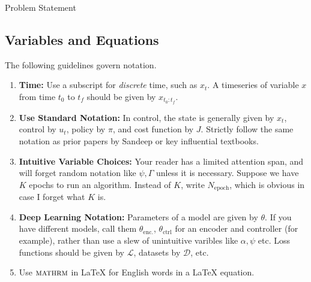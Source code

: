 Problem Statement

\subsection{Variables and Equations}

The following guidelines govern notation.

\begin{enumerate}
    \item \textbf{Time: } Use a subscript for \textit{discrete} time, such as $x_t$. A timeseries of variable $x$ from time $t_0$ to $t_f$ should be given by $x_{t_0:t_f}$.
    \item \textbf{Use Standard Notation: } In control, the state is generally given by $x_t$, control by $u_t$, policy by $\pi$, and cost function by $J$. Strictly follow the same notation as prior papers by Sandeep or key influential textbooks.
    \item \textbf{Intuitive Variable Choices: } Your reader has a limited attention span, and will forget random notation like $\psi, \Gamma$ unless it is necessary. Suppose we have $K$ epochs to run an algorithm. Instead of $K$, write $N_{\mathrm{epoch}}$, which is obvious in case I forget what $K$ is.
    \item \textbf{Deep Learning Notation: } Parameters of a model are given by $\theta$. If you have different models, call them $\theta_{\mathrm{enc.}}$, $\theta_{\mathrm{ctrl}}$ for an encoder and controller (for example), rather than use a slew of unintuitive varibles like $\alpha, \psi$ etc. Loss functions should be given by $\mathcal{L}$, datasets by $\mathcal{D}$, etc.
    \item Use $\textsc{mathrm}$ in LaTeX for English words in a LaTeX equation.
\end{enumerate}

